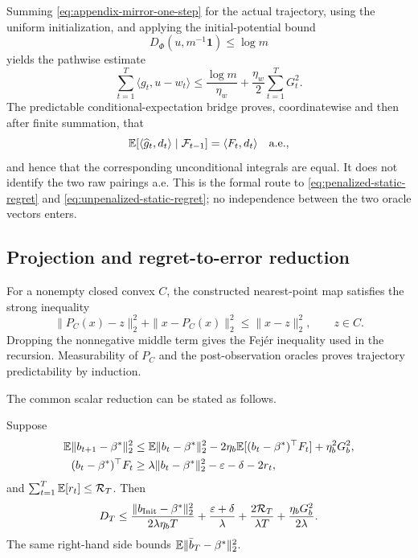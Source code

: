 Summing \eqref{eq:appendix-mirror-one-step} for the actual trajectory,
using the uniform initialization, and applying the initial-potential bound
\[
  D_\Phi(u,m^{-1}\mathbf1)\le\log m
\]
yields the pathwise estimate
\begin{equation}
  \sum_{t=1}^T\langle g_t,u-w_t\rangle
  \le
  \frac{\log m}{\eta_w}
  +\frac{\eta_w}{2}\sum_{t=1}^T G_t^2.
  \label{eq:appendix-entropy-regret}
\end{equation}
The predictable conditional-expectation bridge proves, coordinatewise and
then after finite summation, that
\[
  \mathbb{E}[\langle\widehat g_t,d_t\rangle\mid\mathcal F_{t-1}]
  =\langle F_t,d_t\rangle\quad\text{a.e.},
\]
and hence that the corresponding unconditional integrals are equal.  It does
not identify the two raw pairings a.e.  This is the formal route to
\eqref{eq:penalized-static-regret} and
\eqref{eq:unpenalized-static-regret}; no independence between the two oracle
vectors enters.

\subsection{Projection and regret-to-error reduction}

For a nonempty closed convex $C$, the constructed nearest-point map satisfies
the strong inequality
\begin{equation}
  \|P_C(x)-z\|_2^2+\|x-P_C(x)\|_2^2
  \le\|x-z\|_2^2,
  \qquad z\in C.
  \label{eq:appendix-pythagorean}
\end{equation}
Dropping the nonnegative middle term gives the Fej\'er inequality used in the
recursion.  Measurability of $P_C$ and the post-observation oracles proves
trajectory predictability by induction.

The common scalar reduction can be stated as follows.
\begin{proposition}
\label{prop:appendix-regret-to-error}
Suppose
\begin{align*}
  \mathbb{E}\|b_{t+1}-\beta^*\|_2^2
  \le{}&\mathbb{E}\|b_t-\beta^*\|_2^2
  -2\eta_b\mathbb{E}[(b_t-\beta^*)^\top F_t]
  +\eta_b^2G_b^2,\\
  (b_t-\beta^*)^\top F_t
  \ge{}&\lambda\|b_t-\beta^*\|_2^2
  -\varepsilon-\delta-2r_t,
\end{align*}
and $\sum_{t=1}^T\mathbb{E}[r_t]\le\mathcal R_T$.  Then
\begin{equation}
  D_T
  \le
  \frac{\|b_{\rm Init}-\beta^*\|_2^2}{2\lambda\eta_bT}
  +\frac{\varepsilon+\delta}{\lambda}
  +\frac{2\mathcal R_T}{\lambda T}
  +\frac{\eta_bG_b^2}{2\lambda}.
  \label{eq:appendix-abstract-bound}
\end{equation}
The same right-hand side bounds
$\mathbb{E}\|\bar b_T-\beta^*\|_2^2$.
\end{proposition}

